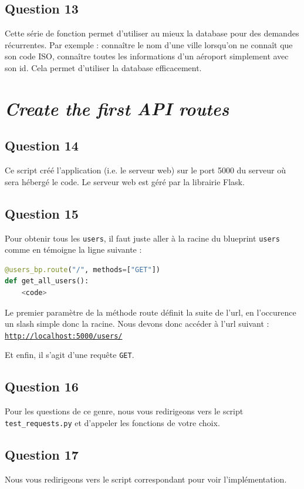 \documentclass{ceri/sty/rapport}
\begin{document}
\subsection{Question 13}
Cette série de fonction permet d'utiliser au mieux la database pour des demandes récurrentes.
Par exemple : connaître le nom d'une ville lorsqu'on ne connaît que son code ISO, connaître toutes les informations d'un aéroport simplement avec son id.
Cela permet d'utiliser la database efficacement.

\section{\textit{Create the first API routes}}
\subsection{Question 14}
Ce script créé l'application (i.e. le serveur web) sur le port 5000 du serveur où sera hébergé le code. Le serveur web est géré par la librairie Flask.

\subsection{Question 15}
Pour obtenir tous les \texttt{users}, il faut juste aller à la racine du blueprint \texttt{users} comme en témoigne la ligne suivante :

\begin{lstlisting}[language=python]
@users_bp.route("/", methods=["GET"])
def get_all_users():
    <code>
\end{lstlisting}

Le premier paramètre de la méthode route définit la suite de l'url, en l'occurence un slash simple donc la racine. Nous devons donc accéder à l'url suivant : \texttt{\url{http://localhost:5000/users/}}

Et enfin, il s'agit d'une requête \texttt{GET}.

\subsection{Question 16}
Pour les questions de ce genre, nous vous redirigeons vers le script \texttt{test\_requests.py} et d'appeler les fonctions de votre choix.

\subsection{Question 17}
Nous vous redirigeons vers le script correspondant pour voir l'implémentation.
\end{document}
